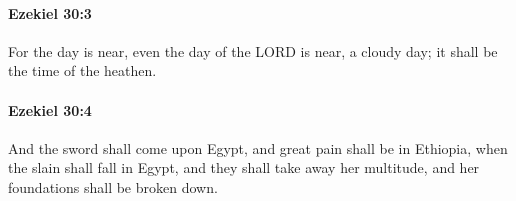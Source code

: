 		\paragraph{Ezekiel 30:3} %
			\label{EZEKIEL-30-3}

			For the day is near, even the day of the LORD is near, a cloudy day; it shall be the time of the heathen.


		\paragraph{Ezekiel 30:4} %
			\label{EZEKIEL-30-4}

			And the sword shall come upon Egypt, and great pain shall be in Ethiopia, when the slain shall fall in Egypt, and they shall take away her multitude, and her foundations shall be broken down.


